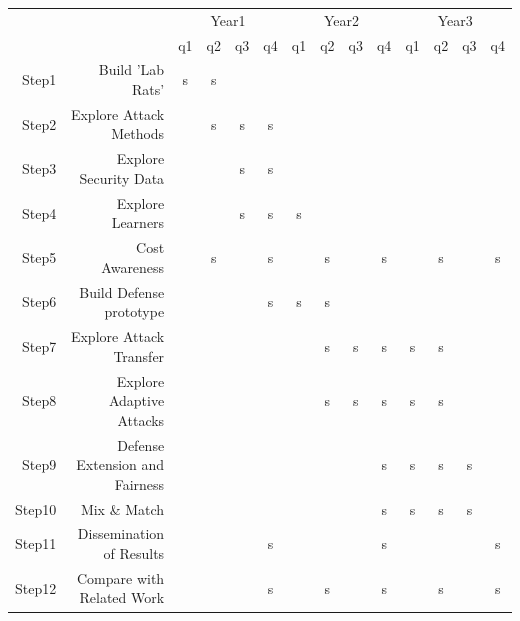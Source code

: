 \documentclass{NSF}
\begin{document}
\begin{nsfdescription}
\newcommand{\X}{\cellcolor{gray!20}s}

{\small \begin{center}\begin{tabular}{rr|cccc|cccc|cccc}
&& \multicolumn{4}{c|}{Year1}& \multicolumn{4}{c|}{Year2}& \multicolumn{4}{c}{Year3} \\
&&q1&q2&q3&q4&q1&q2&q3&q4&q1&q2&q3&q4\\\hline
Step1&Build 'Lab Rats' & \X & \X & &&&  &&& &&& \\
Step2&Explore Attack Methods && \X &\X & \X&&  &&& &&& \\
Step3&Explore Security Data & & & \X & \X &   &&& &&& \\
Step4&Explore Learners & & & \X & \X & \X  &&& &&& \\
Step5&Cost Awareness &  &\X & &\X&  &\X & &\X &&\X&&\X \\
Step6&Build Defense prototype & & & &\X & \X &\X&& && & \\
Step7&Explore Attack Transfer &  & & & & &\X&\X&\X &\X&\X& \\
Step8&Explore Adaptive Attacks &  & & & & &\X&\X&\X &\X&\X& \\
Step9&Defense Extension and Fairness & & &&&  & &&\X&\X&\X&\X& \\
Step10&Mix \& Match &  & & &&  &&&\X &\X &\X &\X & \\
Step11&Dissemination of Results &  & & &\X&& &&\X &&& &\X \\
Step12&Compare with Related Work &  & & &\X&&\X&&\X &&\X& &\X \\
\end{tabular}
\end{center}}


\end{nsfdescription}
\end{document}
